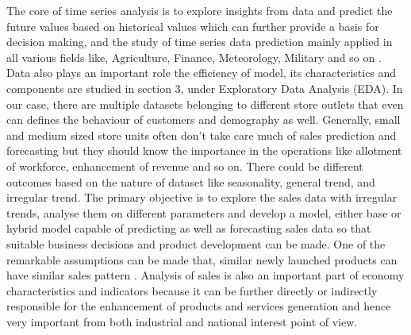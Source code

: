  The core of time series analysis is to explore insights from data and predict the future values based on historical values which can further provide a basis for decision making, and the study of time series data prediction mainly applied in all various fields like, Agriculture, Finance, Meteorology, Military and so on \cite{ensafi2022time}. Data also plays an important role the efficiency of model, its characteristics and components are studied in section 3, under Exploratory Data Analysis (EDA). In our case, there are multiple datasets belonging to different store outlets that even can defines the behaviour of customers and demography as well. 
Generally, small and medium sized store units often don’t take care much of sales prediction and forecasting but they should know the importance in the operations like allotment of workforce, enhancement of revenue and so on. There could be different outcomes based on the nature of dataset like seasonality, general trend, and irregular trend. The primary objective is to explore the sales data with irregular trends, analyse them on different parameters and develop a model, either base or hybrid model capable of predicting as well as forecasting sales data so that suitable business decisions and product development can be made. One of the remarkable assumptions can be made that, similar newly launched products can have similar sales pattern \cite{pavlyshenko2019machine}. Analysis of sales is also an important part of economy characteristics and indicators because it can be further directly or indirectly responsible for the enhancement of products and services generation and hence very important from both industrial and national interest point of view. 

